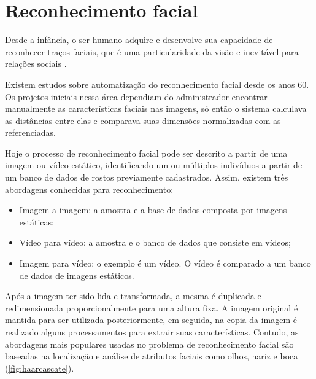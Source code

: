 \section{Reconhecimento facial}\label{sec:reconhecimento}

Desde a infância, o ser humano adquire e desenvolve sua capacidade de reconhecer traços faciais, 
que é uma particularidade da visão e inevitável para relações sociais \cite[p. 16]{rouhani2019}.

Existem estudos sobre automatização do reconhecimento facial desde os anos 60. Os projetos iniciais nessa 
área dependiam do administrador encontrar manualmente as características faciais nas imagens, só 
então o sistema calculava as distâncias entre elas e comparava suas dimensões normalizadas com 
as referenciadas.

Hoje o processo de reconhecimento facial pode ser descrito a partir de uma imagem ou vídeo estático, 
identificando um ou múltiplos indivíduos a partir de um banco de dados de rostos previamente 
cadastrados. Assim, existem três abordagens conhecidas para reconhecimento:

\begin{itemize}
    \item Imagem a imagem: a amostra e a base de dados composta por imagens estáticas;

    \item Vídeo para vídeo: a amostra e o banco de dados que consiste em vídeos;

    \item Imagem para vídeo: o exemplo é um vídeo. O vídeo é comparado a um banco de 
    dados de imagens estáticos. 
\end{itemize}

Após a imagem ter sido lida e transformada, a mesma é duplicada e redimensionada 
proporcionalmente para uma altura fixa. A imagem original é mantida para ser 
utilizada posteriormente, em seguida, na copia da imagem é realizado alguns 
processamentos para extrair suas características. Contudo, as abordagens mais 
populares usadas no problema de reconhecimento facial são 
baseadas na localização e análise de atributos faciais como olhos, nariz e 
boca (\autoref{fig:haarcascate}).

